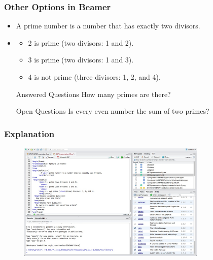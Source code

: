 \documentclass{beamer}\usepackage[]{graphicx}\usepackage[]{color}
\begin{document}
\begin{frame}
\frametitle{Other Options in Beamer}
\begin{itemize}
\item
\begin{definition}
         A \alert{prime number} is a number that has exactly two divisors.
       \end{definition}
\item
 \begin{itemize}
       \item 2 is prime (two divisors: 1 and 2).
         \pause
       \item 3 is prime (two divisors: 1 and 3).
         \pause
       \item 4 is not prime (\alert{three} divisors: 1, 2, and 4).
       \end{itemize}
  \begin{block}{Answered Questions}
    How many primes are there?
  \end{block}
  \begin{block}{Open Questions}
    Is every even number the sum of two primes?
  \end{block}
\end{itemize}
\end{frame}


\begin{frame}
\frametitle{Explanation}
\begin{figure}[ht!]
\centering
\includegraphics[width=90mm]{Screenshot03}
\end{figure}
\end{frame}
\end{document}

